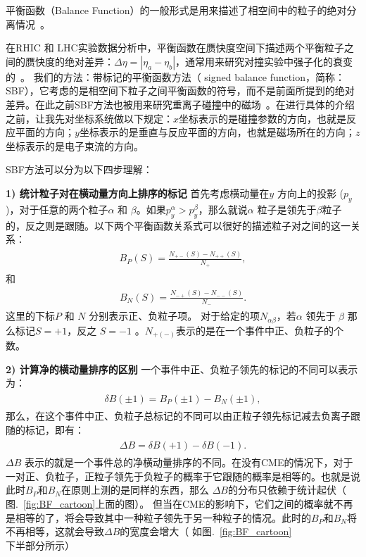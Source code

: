 平衡函数（Balance Function）的一般形式是用来描述了相空间中的粒子的绝对分离情况~\cite{Bass:2000az,Adams:2003kg}。

在RHIC 和 LHC实验数据分析中，平衡函数在赝快度空间下描述两个平衡粒子之间的赝快度的绝对差异：$\Delta \eta = |\eta_a - \eta_b|$，通常用来研究对撞实验中强子化的衰变的~\cite{bf1,bf2,bf3,bf4,bf5}。
我们的方法：带标记的平衡函数方法（ signed balance function，简称：SBF），它考虑的是相空间下粒子之间平衡函数的符号，而不是前面所提到的绝对差异。在此之前SBF方法也被用来研究重离子碰撞中的磁场~\cite{Ye:2018jwq}。在进行具体的介绍之前，让我先对坐标系统做以下规定：$x$坐标表示的是碰撞参数的方向，也就是反应平面的方向；$y$坐标表示的是垂直与反应平面的方向，也就是磁场所在的方向；$z$坐标表示的是电子束流的方向。

SBF方法可以分为以下四步理解：


\textbf{1) 统计粒子对在横动量方向上排序的标记 } 首先考虑横动量在$y$ 方向上的投影 ($p_y$)，对于任意的两个粒子$\alpha$ 和 $\beta$。如果$p^\alpha_y >  p^\beta_y$，那么就说$\alpha$ 粒子是领先于$\beta$粒子的，反之则是跟随。以下两个平衡函数关系式可以很好的描述粒子对之间的这一关系：
\begin{eqnarray}
\begin{aligned}
B_{P} (S) =  \frac{N_{+-}(S)-N_{++}(S)}{N_+},
\end{aligned}
\label{eq:Bp}
\end{eqnarray}
和
\begin{eqnarray}
\begin{aligned}
B_{N} (S) =  \frac{N_{-+}(S)-N_{--}(S)}{N_-}.
\end{aligned}
\label{eq:Bn}
\end{eqnarray}
这里的下标$P$ 和 $N$ 分别表示正、负粒子项。
对于给定的项$N_{\alpha\beta}$，若$\alpha$ 领先于 $\beta$ 那么标记$S=+1$，反之 $S=-1$ 。$N_{+(-)}$表示的是在一个事件中正、负粒子的个数。

\textbf{2) 计算净的横动量排序的区别 } 一个事件中正、负粒子领先的标记的不同可以表示为：
\begin{eqnarray}
\begin{aligned}
\delta B(\pm 1) =  B_{P}(\pm 1)-B_{N}(\pm 1),
\end{aligned}
\label{eq:deltaB_pm}
\end{eqnarray}
那么，在这个事件中正、负粒子总标记的不同可以由正粒子领先标记减去负离子跟随的标记，即有：
\begin{eqnarray}
\begin{aligned}
\Delta B =  \delta B(+1) - \delta B(-1).
\end{aligned}
\label{eq:deltaB}
\end{eqnarray}
$\Delta B$ 表示的就是一个事件总的净横动量排序的不同。在没有CME的情况下，对于一对正、负粒子，正粒子领先于负粒子的概率于它跟随的概率是相等的。也就是说此时$B_P$和$B_N$在原则上测的是同样的东西，那么 $\Delta B$的分布只依赖于统计起伏（ 图.~\ref{fig:BF_cartoon}上面的图）。 但当在CME的影响下，它们之间的概率就不再是相等的了，将会导致其中一种粒子领先于另一种粒子的情况。此时的$B_P$和$B_N$将不再相等，这就会导致$\Delta B$的宽度会增大（ 如图.~\ref{fig:BF_cartoon}下半部分所示）

